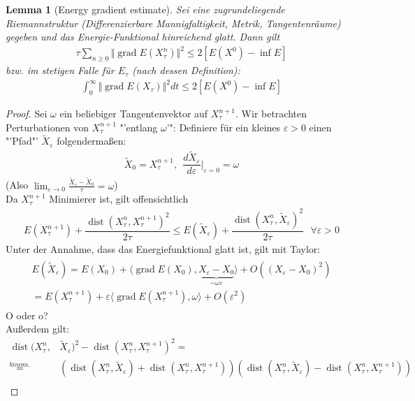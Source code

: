 \documentclass[11pt,a4paper,notitlepage]{scrreprt}
\newcommand{\dist}{\operatorname{dist}}
\newcommand{\grad}{\operatorname{grad}}
\newtheorem{lem}[defi]{Lemma}
\begin{document}
 
\begin{lem}[Energy gradient estimate]
Sei eine zugrundeliegende Riemannstruktur (Differenzierbare Mannigfaltigkeit, Metrik, Tangentenräume) gegeben und das Energie-Funktional hinreichend glatt. Dann gilt 
\begin{eqnarray}
\tau \sum_{n\geq 0} \Vert\grad E(X_\tau^n)\Vert^2 \leq 2[E(X^0)-\inf E]
\end{eqnarray}
bzw. im stetigen Falle für $E_\tau$ (nach dessen Definition):
\begin{eqnarray}
\int_0^\infty \Vert\grad E(X_\tau)\Vert^2 dt\leq 2[E(X^0)-\inf E]
\label{Engrad}
\end{eqnarray}
\end{lem}
\begin{proof}
Sei $\omega$ ein beliebiger Tangentenvektor auf $X_\tau^{n+1}$. Wir betrachten Perturbationen von $X_\tau^{n+1}$ "'entlang $\omega$'": Definiere für ein kleines $\varepsilon>0$ einen "'Pfad"' $\tilde{X}_\varepsilon$ folgendermaßen:\\
\begin{eqnarray}
\tilde{X}_0=X_\tau^{n+1},~~\dfrac{d\tilde{X}_\varepsilon}{d\varepsilon}\Bigg|_{\varepsilon=0} =\omega
\end{eqnarray}
(Also $\lim_{\varepsilon\to 0}\frac{\tilde{X}_\varepsilon-\tilde{X}_0}{\tau}=\omega$)\\
Da $X_\tau^{n+1}$ Minimierer ist, gilt offensichtlich
\begin{eqnarray}
E(X_\tau^{n+1})+\dfrac{\dist(X_\tau^n,X_\tau^{n+1})^2}{2\tau}\leq E(\tilde{X}_\varepsilon)+\dfrac{\dist(X_\tau^n,\tilde{X}_\varepsilon)^2}{2\tau}~~~\forall \varepsilon>0 \label{a)}
\end{eqnarray}
Unter der Annahme, dass das Energiefunktional glatt ist, gilt mit Taylor:
\begin{eqnarray}
\begin{split}
E(\tilde{X}_\varepsilon)=E(X_0)+\langle\grad E(X_0),\underset{\sim\omega\varepsilon}{\underbrace{X_\varepsilon -X_0}}\rangle+O((X_\varepsilon-X_0)^2)\\
=E(X_\tau^{n+1})+\varepsilon\langle \grad E(X_\tau^{n+1}),\omega\rangle+O(\varepsilon^2) \label{b)}
\end{split}
\end{eqnarray}
O oder o?\\
Außerdem gilt:
\begin{align*}
\dist (X_\tau^n,&\tilde{X}_\varepsilon)^2-\dist(X_\tau^n,X_\tau^{n+1})^2=\\
\overset{binom.}=&\left(\dist(X_\tau^n,\tilde{X}_\varepsilon)+\dist(X_\tau^n,X_\tau^{n+1})\right)\left(\dist(X_\tau^n,\tilde{X}_\varepsilon)-\dist(X_\tau^n,X_\tau^{n+1})\right)\\

\end{align*}
\end{proof}
\end{document}
